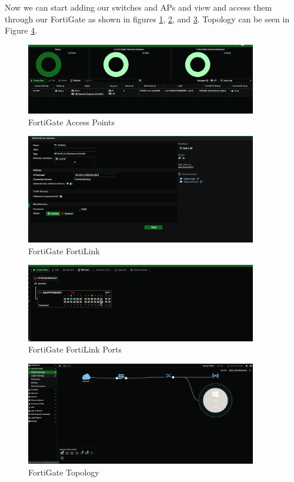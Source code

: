 \documentclass[12pt]{report}
\begin{document}
Now we can start adding our switches and APs and view and access them through our FortiGate as shown in figures \ref{fig:ap}, \ref{fig:fl}, and \ref{fig:flports1}. Topology can be seen in Figure \ref{fig:fltop}.
\begin{figure}
    \centering
    \includegraphics[width=0.9\textwidth]{images/Implementation/ap.png}
    \caption{FortiGate Access Points}
    \label{fig:ap}
\end{figure}
\begin{figure}
    \centering
    \includegraphics[width=0.9\textwidth]{images/Implementation/fl.png}
    \caption{FortiGate FortiLink}
    \label{fig:fl}
\end{figure}
\begin{figure}
    \centering
    \includegraphics[width=0.9\textwidth]{images/Implementation/flports1.png}
    \caption{FortiGate FortiLink Ports}
    \label{fig:flports1}
\end{figure}
\begin{figure}
    \centering
    \includegraphics[width=0.9\textwidth]{images/Implementation/fltop.png}
    \caption{FortiGate Topology}
    \label{fig:fltop}
\end{figure}
\end{document}

